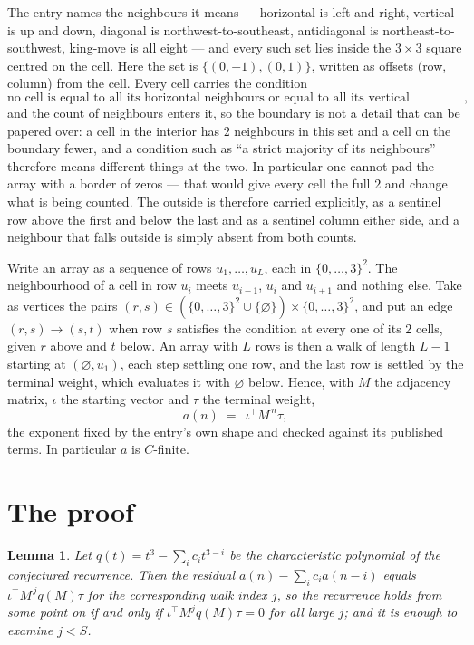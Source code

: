 \documentclass[11pt,a4paper]{article}
\theoremstyle{plain}
\newtheorem{lemma}[theorem]{Lemma}
\theoremstyle{definition}
\begin{document}
The entry names the neighbours it means --- horizontal is left and right, vertical is up and
down, diagonal is northwest-to-southeast, antidiagonal is northeast-to-southwest, king-move is
all eight --- and every such set lies inside the $3\times3$ square centred on the cell. Here
the set is $\{(0,-1), (0,1)\}$, written as offsets (row, column) from the cell. Every cell carries
the condition
\[
\text{no cell is equal to all its horizontal neighbours or equal to all its vertical neighbours},
\]
and the count of neighbours enters it, so the boundary is not a detail that can be papered
over: a cell in the interior has $2$ neighbours in this set and a cell on the boundary
fewer, and a condition such as ``a strict majority of its neighbours'' therefore means
different things at the two. In particular one cannot pad the array with a border of zeros ---
that would give every cell the full $2$ and change what is being counted. The outside is
therefore carried
explicitly, as a sentinel row above the first and below the last and as a sentinel column
either side, and a neighbour that falls outside is simply absent from both counts.

Write an array as a sequence of rows $u_1,\dots,u_L$, each in
$\{0,\dots,3\}^{2}$. The neighbourhood of a cell in row $u_i$ meets $u_{i-1}$,
$u_i$ and $u_{i+1}$ and nothing else. Take as vertices the pairs
$(r,s)\in(\{0,\dots,3\}^{2}\cup\{\varnothing\})\times\{0,\dots,3\}^{2}$,
and put an edge $(r,s)\to(s,t)$ when row $s$ satisfies the condition at every one of its
$2$ cells, given $r$ above and $t$ below. An array with $L$ rows is then a walk of length
$L-1$ starting at $(\varnothing,u_1)$, each step settling one row, and the last row is
settled by the terminal weight, which evaluates it with $\varnothing$ below. Hence,
with $M$ the adjacency matrix, $\iota$ the starting vector and $\tau$ the terminal weight,
\[
a(n)\;=\;\,\iota^{\!\top}M^{\,n}\tau ,
\]
the exponent fixed by the entry's own shape and checked against its published terms. In
particular $a$ is $C$-finite.

\section{The proof}

\begin{lemma}\label{lem:crit}
Let $q(t)=t^{3}-\sum_i c_it^{3-i}$ be the characteristic polynomial of the
conjectured recurrence. Then the residual $a(n)-\sum_ic_ia(n-i)$ equals
$\iota^{\!\top}M^{\,j}q(M)\tau$ for the corresponding walk index $j$, so the
recurrence holds from some point on if and only if $\iota^{\!\top}M^{j}q(M)\tau=0$ for all
large $j$; and it is enough to examine $j<S$.
\end{lemma}
\end{document}
